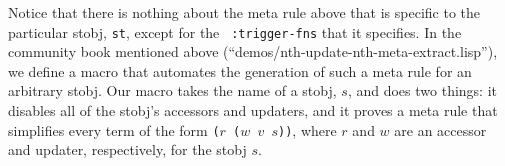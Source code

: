 Notice that there is nothing about the meta rule above that is
specific to the particular stobj, {\tt st}, except for the {\tt
  :trigger-fns} that it specifies.  In the community book mentioned
above (``demos/nth-\allowbreak{}update-\allowbreak{}nth-\allowbreak{}meta-\allowbreak{}extract.lisp''), we define a macro
that automates the generation of such a meta rule for an
arbitrary stobj.  Our macro takes the name of a stobj, $s$, and does two
things: it disables all of the stobj's accessors and updaters, and it
proves a meta rule that simplifies every term of the form {\tt ($r$
  ($w$ $v$ $s$))}, where $r$ and $w$ are an accessor and updater,
respectively, for the stobj $s$.


